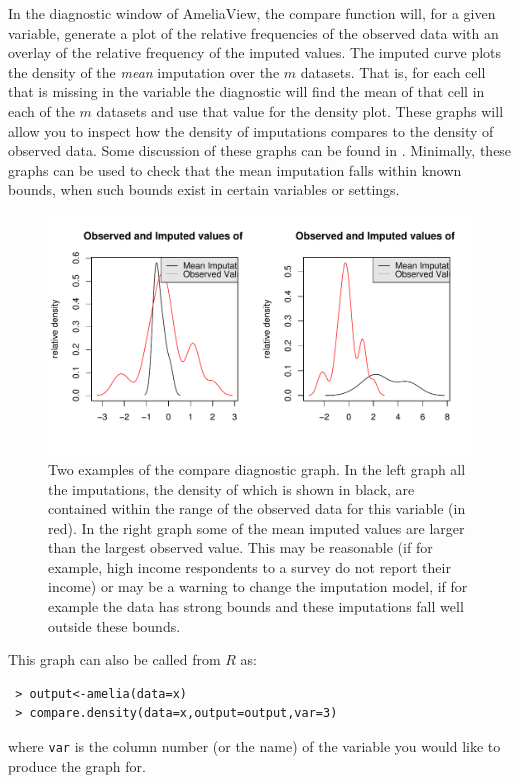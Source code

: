\documentclass[12pt,titlepage]{article}
\begin{document}
In the diagnostic window of AmeliaView, the compare function will, for
a given variable, generate a plot of the relative frequencies of the
observed data with an overlay of the relative frequency of the imputed
values.  The imputed curve plots the density of the \emph{mean}
imputation over the $m$ datasets.  That is, for each cell that is
missing in the variable the diagnostic will find the mean of that
cell in each of the $m$ datasets and use that value for the density
plot.  These graphs will allow you to inspect how the density of
imputations compares to the density of observed data. Some discussion
of these graphs can be found in \citet*{AbaGelLev08}.  Minimally, these
graphs can be used to check that the mean imputation falls within
known bounds, when such bounds exist in certain variables or settings.
\begin{figure}[htp!]
  \centering \includegraphics[scale=.8]{comp}
  \caption{Two examples of the compare diagnostic graph.  In the left
    graph all the imputations, the density of which is shown in black,
    are contained within the range of the observed data for this
    variable (in red).  In the right graph some of the mean imputed
    values are larger than the largest observed value.  This may be
    reasonable (if for example, high income respondents to a survey do
    not report their income) or may be a warning to change the
    imputation model, if for example the data has strong bounds and
    these imputations fall well outside these bounds.}
  \label{f:oi1}
\end{figure}


This graph can also be called from $R$ as:
\begin{verbatim}
 > output<-amelia(data=x) 
 > compare.density(data=x,output=output,var=3)
\end{verbatim}
where \texttt{var} is the column number (or the name) of the variable
you would like to produce the graph for.
\end{document}
